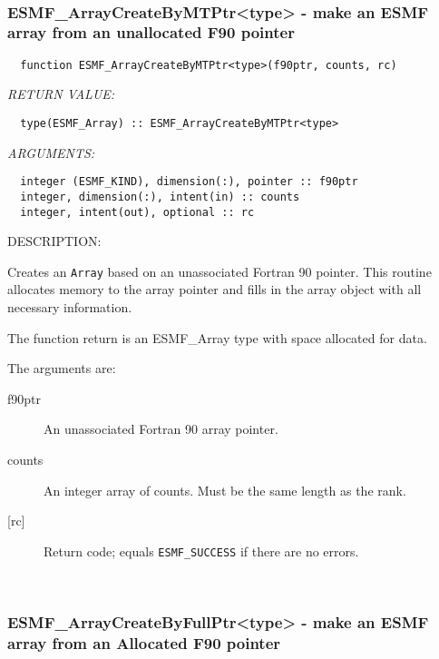   
    
 
\mbox{}\hrulefill\ 
 
\subsubsection [ESMF\_ArrayCreateByMTPtr<type>] {ESMF\_ArrayCreateByMTPtr<type> - make an ESMF array from an unallocated F90 pointer }


  
\begin{verbatim}  function ESMF_ArrayCreateByMTPtr<type>(f90ptr, counts, rc) 
   \end{verbatim}{\em RETURN VALUE:}
\begin{verbatim}  type(ESMF_Array) :: ESMF_ArrayCreateByMTPtr<type> 
   \end{verbatim}{\em ARGUMENTS:}
\begin{verbatim}  integer (ESMF_KIND), dimension(:), pointer :: f90ptr 
  integer, dimension(:), intent(in) :: counts 
  integer, intent(out), optional :: rc 
   \end{verbatim}
{\sf DESCRIPTION:\\ }

 
   Creates an {\tt Array} based on an unassociated Fortran 90 pointer. 
   This routine allocates memory to the array pointer and fills in 
   the array object with all necessary information. 
   
   The function return is an ESMF\_Array type with space allocated for data. 
   
   The arguments are: 
   \begin{description} 
   \item[f90ptr] 
   An unassociated Fortran 90 array pointer. 
   
   \item[counts] 
   An integer array of counts. Must be the same length as the rank. 
   
   \item[{[rc]}] 
   Return code; equals {\tt ESMF\_SUCCESS} if there are no errors. 
   \end{description} 
     
    
 
\mbox{}\hrulefill\ 
 
\subsubsection [ESMF\_ArrayCreateByFullPtr<type>] {ESMF\_ArrayCreateByFullPtr<type> - make an ESMF array from an Allocated F90 pointer }



